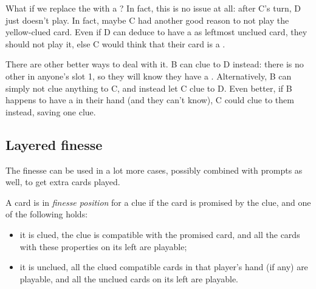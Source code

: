 \begin{remark}
	What if we replace the  with a ? In fact, this is no issue at all: after C's turn, D just doesn't play. In fact, maybe C had another good reason to not play the yellow-clued card. Even if D can deduce to have a  as leftmost unclued card, they should not play it, else C would think that their card is a .
	
	There are other better ways to deal with it. B can clue  to D instead: there is no other  in anyone's slot 1, so they will know they have a . Alternatively, B can simply not clue anything to C, and instead let C clue  to D. Even better, if B happens to have a  in their hand (and they can't know), C could clue  to them instead, saving one clue.
\end{remark}

\subsection{Layered finesse}

The finesse can be used in a lot more cases, possibly combined with prompts as well, to get extra cards played.

\begin{definition}
	\label{def:finesse-position}
	A card is in \emph{finesse position} for a clue if the card is promised by the clue, and one of the following holds:
	
	\begin{itemize}
		\item it is clued, the clue is compatible with the promised card, and all the cards with these properties on its left are playable;
		\item it is unclued, all the clued compatible cards in that player's hand (if any) are playable, and all the unclued cards on its left are playable.
	\end{itemize}
\end{definition}

